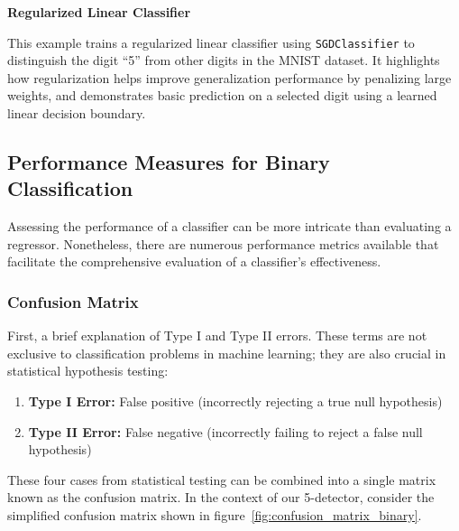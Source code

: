 \documentclass[12pt,letter]{article}
\begin{document}
\begin{example}
\textbf{Regularized Linear Classifier}

\noindent This example trains a regularized linear classifier using \texttt{SGDClassifier} to distinguish the digit ``5'' from other digits in the MNIST dataset. It highlights how regularization helps improve generalization performance by penalizing large weights, and demonstrates basic prediction on a selected digit using a learned linear decision boundary.
\end{example}



\subsection{Performance Measures for Binary Classification}

Assessing the performance of a classifier can be more intricate than evaluating a regressor. Nonetheless, there are numerous performance metrics available that facilitate the comprehensive evaluation of a classifier's effectiveness.



\subsubsection{Confusion Matrix}

First, a brief explanation of Type I and Type II errors. These terms are not exclusive to classification problems in machine learning; they are also crucial in statistical hypothesis testing:

\begin{enumerate}
\item[] \textbf{Type I Error:} False positive (incorrectly rejecting a true null hypothesis)
\item[] \textbf{Type II Error:} False negative (incorrectly failing to reject a false null hypothesis)
\end{enumerate}

These four cases from statistical testing can be combined into a single matrix known as the confusion matrix. In the context of our 5-detector, consider the simplified confusion matrix shown in figure~\ref{fig:confusion_matrix_binary}.
\end{document}
